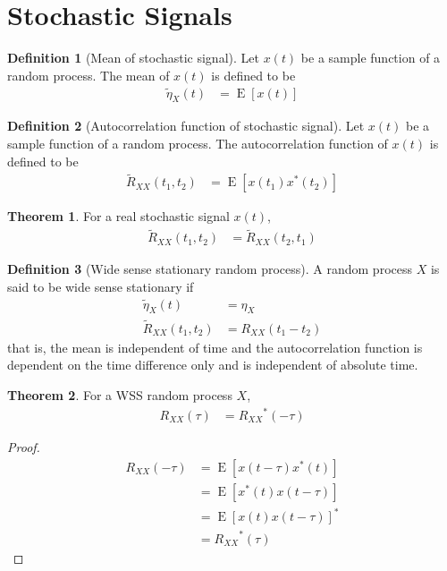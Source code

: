 \documentclass[titlepage, fleqn, a4paper, 12pt, twoside]{article}
\theoremstyle{definition}
\newtheorem{definition}{Definition}
\theoremstyle{theorem}
\newtheorem{theorem}{Theorem}
\renewcommand{\tilde}{\widetilde}
\DeclareMathOperator{\expct}{\mathrm{E}}
\begin{document}
\section{Stochastic Signals}

\begin{definition}[Mean of stochastic signal]
	Let $x(t)$ be a sample function of a random process.
	The mean of $x(t)$ is defined to be
	\begin{align*}
		\tilde{\eta}_X(t) &= \expct\left[ x(t) \right]
	\end{align*}
\end{definition}

\begin{definition}[Autocorrelation function of stochastic signal]
	Let $x(t)$ be a sample function of a random process.
	The autocorrelation function of $x(t)$ is defined to be
	\begin{align*}
		\tilde{R}_{X X}(t_1,t_2) &= \expct\left[ x(t_1) x^*(t_2) \right]
	\end{align*}
\end{definition}

\begin{theorem}
	For a real stochastic signal $x(t)$,
	\begin{align*}
		\tilde{R}_{X X}(t_1,t_2) &= \tilde{R}_{X X}(t_2,t_1)
	\end{align*}
\end{theorem}

\begin{definition}[Wide sense stationary random process]
	A random process $X$ is said to be wide sense stationary if
	\begin{align*}
		\tilde{\eta}_X(t) &= \eta_X\\
		\tilde{R}_{X X}(t_1,t_2) &= R_{X X}(t_1 - t_2)
	\end{align*}
	that is, the mean is independent of time and the autocorrelation function is dependent on the time difference only and is independent of absolute time.
\end{definition}

\begin{theorem}
	For a WSS random process $X$,
	\begin{align*}
		R_{X X}(\tau) &= {R_{X X}}^*(-\tau)
	\end{align*}
\end{theorem}

\begin{proof}
	\begin{align*}
		R_{X X}(-\tau) &= \expct\left[ x(t - \tau) x^*(t) \right]\\
		&= \expct\left[ x^*(t) x(t - \tau) \right]\\
		&= \expct\left[ x(t) x(t - \tau) \right]^*\\
		&= {R_{X X}}^*(\tau)
	\end{align*}
\end{proof}
\end{document}
